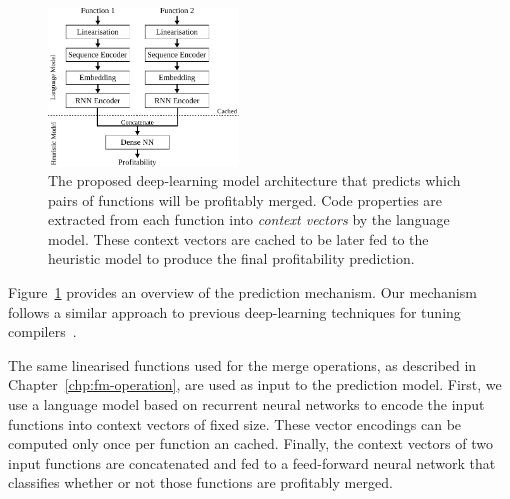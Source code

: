 \begin{figure}[h]
  \centering
  \includegraphics[width=0.45\textwidth]{figs/deeplearning-architecture.pdf}
  \caption{
      The proposed deep-learning model architecture that predicts which pairs of functions will be profitably merged. Code properties are extracted from each function into \textit{context vectors} by the language model.
      These context vectors are cached to be later fed to the heuristic model to produce the final profitability prediction.}
  \label{fig:heuristic-model-architecture}
\end{figure}

Figure~\ref{fig:heuristic-model-architecture} provides an overview of the prediction mechanism.
Our mechanism follows a similar approach to previous deep-learning techniques for tuning compilers~\cite{cummins17, mendis19}.

The same linearised functions used for the merge operations, as described in Chapter~\ref{chp:fm-operation}, are used as input to the prediction model.
First, we use a language model based on recurrent neural networks to encode the input functions into context vectors of fixed size.
These vector encodings can be computed only once per function an cached.
Finally, the context vectors of two input functions are concatenated and fed to a feed-forward neural network that classifies whether or not those functions are profitably merged.

